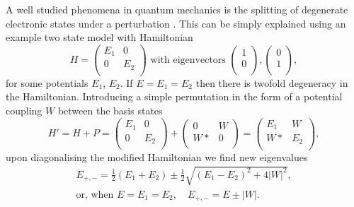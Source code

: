 \documentclass[12pt]{report} %
\begin{document}
A well studied phenomena in quantum mechanics is the splitting of degenerate electronic states under a perturbation \cite{Verhoeven1996, Cohen-Tannoudji2006}. This can be simply explained using an example two state model with Hamiltonian
%
\begin{equation}
  H = \begin{pmatrix}
        E_1 & 0 \\
        0 & E_2 \\
      \end{pmatrix}
      \text{ with eigenvectors }
      \begin{pmatrix}
        1\\
        0\\
      \end{pmatrix},
      \begin{pmatrix}
        0\\
        1\\
      \end{pmatrix},
\end{equation}
for some potentials $E_1$, $E_2$. If $E = E_1 = E_2$ then there is twofold degeneracy in the Hamiltonian. Introducing a simple permutation in the form of a potential coupling $W$ between the basis states
\begin{equation}
  H' = H + P =\begin{pmatrix}
    E_1 & 0 \\
    0 & E_2 \\
  \end{pmatrix}
  +\begin{pmatrix}
    0 & W \\
    W* & 0 \\
  \end{pmatrix}
  =\begin{pmatrix}
    E_1 & W \\
    W* & E_2 \\
  \end{pmatrix},
  \label{perturbation_matrix}
\end{equation}
upon diagonalising the modified Hamiltonian we find new eigenvalues 
\begin{equation}
\begin{gathered}
  E_{+, -} = {\frac{1}{2}(E_1 + E_2)} \pm {\frac{1}{2}\sqrt{(E_1-E_2)^2+4|W|^2}},\\
  \text{or, when } E = E_1 = E_2, \quad E_{+,-} = E \pm |W|.
\end{gathered}
  \label{perturbation_energy}
\end{equation}
\end{document}
